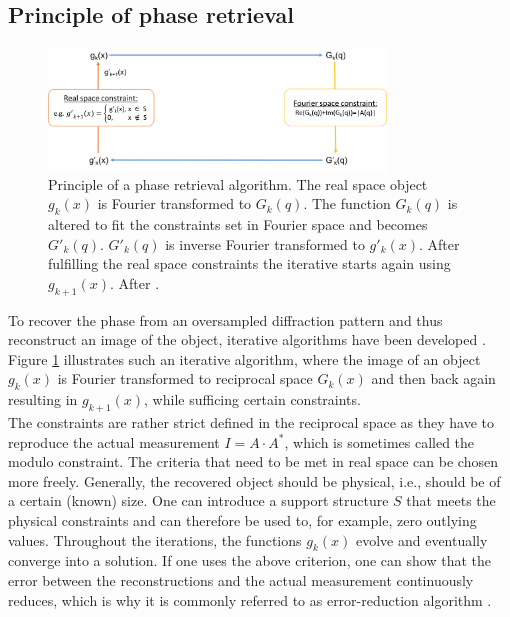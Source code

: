 \subsection{Principle of phase retrieval}\label{sec:phase-retrieval-fundamental}
\begin{figure}
	\centering
		\includegraphics[width=0.80\textwidth]{images/phase-retrieval-algorithm.png}
	\caption[Example of a phase retrieval algorithm.]{Principle of a phase retrieval algorithm. The real space object $g_{k}\left(x\right)$ is Fourier transformed to $G_{k}\left(q\right)$. The function $G_{k}\left(q\right)$ is altered to fit the constraints set in Fourier space and becomes $G'_{k}\left(q\right)$. $G'_{k}\left(q\right)$ is inverse Fourier transformed to $g'_{k}\left(x\right)$. After fulfilling the real space constraints the iterative starts again using $g_{k+1}\left(x\right)$. After \citep{Fienup-1982-AO}.}
	\label{fig:phase-retrieval-algorithm}
\end{figure}
To recover the phase from an oversampled diffraction pattern and thus reconstruct an image of the object, iterative algorithms have been developed \cite{Fienup-1982-AO}. Figure \ref{fig:phase-retrieval-algorithm} illustrates such an iterative algorithm, where the image of an object $g_{k}\left(x\right)$ is Fourier transformed to reciprocal space $G_{k}\left(x\right)$ and then back again resulting in $g_{k+1}(x)$, while sufficing certain constraints.\\
The constraints are rather strict defined in the reciprocal space as they have to reproduce the actual measurement $I=A\cdot A^{*}$, which is sometimes called the modulo constraint. The criteria that need to be met in real space can be chosen more freely. Generally, the recovered object should be physical, i.e., should be of a certain (known) size. One can introduce a support structure $S$ that meets the physical constraints and can therefore be used to, for example, zero outlying values. Throughout the iterations, the functions $g_{k}(x)$ evolve and eventually converge into a solution. If one uses the above criterion, one can show that the error between the reconstructions and the actual measurement continuously reduces, which is why it is commonly referred to as error-reduction algorithm \cite{Fienup-1978-OL}.
%
%
%
%
